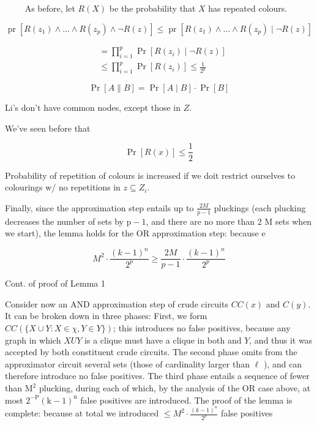 $\qquad$ As before, let $R(X)$ be the probability that $X$ has repeated colours.

$$
\operatorname{pr}\left[R\left(z_1\right) \wedge \ldots \wedge R\left(z_p\right) \wedge \neg R(z)\right] \leqslant \operatorname{pr}\left[R\left(z_1\right) \wedge \ldots \wedge R\left(z_p\right) \mid \neg R(z)\right]$$

$$
\begin{aligned}
& =\prod_{i=1}^p \operatorname{Pr}\left[R\left(z_i\right) \mid \neg R(z)\right] \\
& \leqslant \prod_{i=1}^p \operatorname{Pr}\left[R\left(z_i\right)\right]
\leqslant \frac{1}{2^p}
\end{aligned}
$$

$$
\operatorname{Pr}[A \| B]=\operatorname{Pr}[A \mid B] \cdot \operatorname{Pr}[B]
$$


Li's don't have common nodes, except those in $Z$.

We've seen before that

$$
\operatorname{Pr}[R(x)] \leqslant \frac{1}{2}
$$

Probability of repetition of colours is increased if we doit restrict ourselves to colourings w/ no repetitions in $z \subseteq Z_i$.


Finally, since the approximation step entails up to $\frac{2 M}{p-1}$ pluckings (each plucking decreases the number of sets by $\mathrm{p}-1$, and there are no more than 2 M sets when we start), the lemma holds for the OR approximation step: because e

$$
M^2 \cdot \frac{(k-1)^n}{2^p} \geq \frac{2 M}{p-1} \cdot \frac{(k-1)^n}{2^p}
$$


Cont. of proof of Lemma 1

Consider now an AND approximation step of crude circuits $C C(x)$ and $C(y)$. It can be broken down in three phases: First, we form $C C(\{X \cup Y: X \in \chi, Y \in Y\})$; this introduces no false positives, because any graph in which $X U Y$ is a clique must have a clique in both and $Y$, and thus it was accepted by both constituent crude circuits. The second phase omits from the approximator circuit several sets (those of cardinality larger than $\ell$ ), and can therefore introduce no false positives. The third phase entails a sequence of fewer than $\mathrm{M}^2$ plucking, during each of which, by the analysis of the OR case above, at most $2^{-\mathrm{P}}(\mathrm{k}-1)^{\mathrm{n}}$ false positives are introduced. The proof of the lemma is complete: because at total we introduced $\leq M^2 \cdot \frac{(k-1)^n}{2^p}$ false positives




